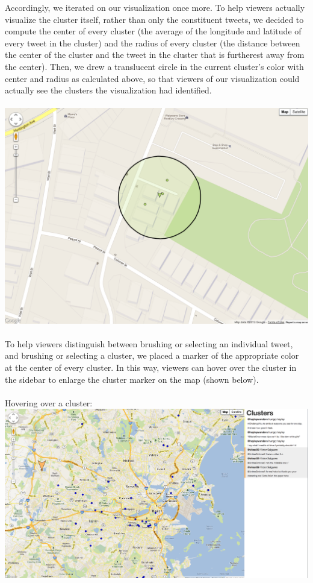 \documentclass[pdftex,12pt,a4paper]{article}
\begin{document}
Accordingly, we iterated on our visualization once more. To help viewers actually visualize the cluster itself, rather than only the constituent tweets, we decided to compute the center of every cluster (the average of the longitude and latitude of every tweet in the cluster) and the radius of every cluster (the distance between the center of the cluster and the tweet in the cluster that is furtherest away from the center). Then, we drew a translucent circle in the current cluster's color with center and radius as calculated above, so that viewers of our visualization could actually see the clusters the visualization had identified. \\ \\
\includegraphics[width=5.5in]{success1.png} \\ \\
To help viewers distinguish between brushing or selecting an individual tweet, and brushing or selecting a cluster, we placed a marker of the appropriate color at the center of every cluster. In this way, viewers can hover over the cluster in the sidebar to enlarge the cluster marker on the map (shown below). \\ \\
Hovering over a cluster: \\
\includegraphics[width=5.5in]{hover1.png} \\ \\
\end{document}
